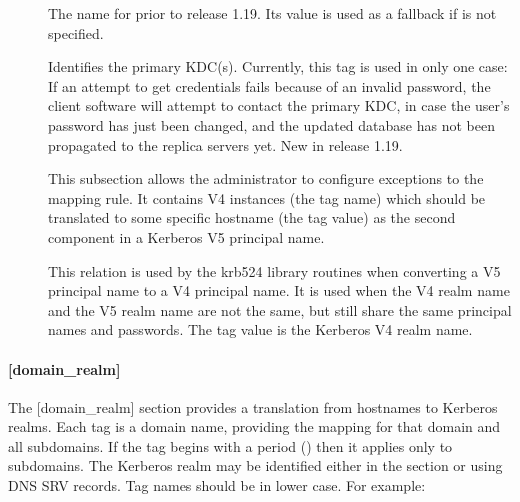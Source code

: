 \documentclass[letterpaper,10pt,english]{sphinxmanual}
\begin{document}
\begin{description}
\item[{}] \leavevmode
The name for  prior to release 1.19.  Its value is
used as a fallback if  is not specified.

\item[{}] \leavevmode
Identifies the primary KDC(s).  Currently, this tag is used in only
one case: If an attempt to get credentials fails because of an
invalid password, the client software will attempt to contact the
primary KDC, in case the user’s password has just been changed, and
the updated database has not been propagated to the replica
servers yet.  New in release 1.19.

\item[{}] \leavevmode
This subsection allows the administrator to configure exceptions
to the  mapping rule.  It contains V4 instances
(the tag name) which should be translated to some specific
hostname (the tag value) as the second component in a Kerberos V5
principal name.

\item[{}] \leavevmode
This relation is used by the krb524 library routines when
converting a V5 principal name to a V4 principal name.  It is used
when the V4 realm name and the V5 realm name are not the same, but
still share the same principal names and passwords. The tag value
is the Kerberos V4 realm name.

\end{description}


\paragraph{{[}domain\_realm{]}}
\label{\detokenize{admin/conf_files/krb5_conf:id3}}\label{\detokenize{admin/conf_files/krb5_conf:domain-realm}}
The {[}domain\_realm{]} section provides a translation from hostnames to
Kerberos realms.  Each tag is a domain name, providing the mapping for
that domain and all subdomains.  If the tag begins with a period
() then it applies only to subdomains.  The Kerberos realm may be
identified either in the {\hyperref[\detokenize{admin/conf_files/krb5_conf:realms}]{}} section or using DNS SRV records.
Tag names should be in lower case.  For example:

%
\begin{sphinxVerbatim}[commandchars=\\\{\}]
\PYG{p}{[}\PYG{p}{]}
      
      
      
\end{sphinxVerbatim}
\end{document}
